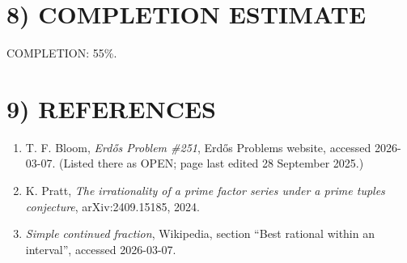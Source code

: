 \section*{8) COMPLETION ESTIMATE}

COMPLETION: 55\%.

\section*{9) REFERENCES}

\begin{enumerate}
\item T. F. Bloom, \emph{Erd\H{o}s Problem \#251}, Erd\H{o}s Problems website, accessed 2026-03-07. (Listed there as OPEN; page last edited 28 September 2025.)
\item K. Pratt, \emph{The irrationality of a prime factor series under a prime tuples conjecture}, arXiv:2409.15185, 2024.
\item \emph{Simple continued fraction}, Wikipedia, section ``Best rational within an interval'', accessed 2026-03-07.
\end{enumerate}
